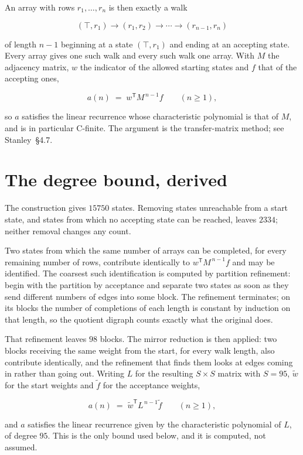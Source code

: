 \documentclass[11pt]{article}
\theoremstyle{definition}
\begin{document}
An array with rows $r_1,\dots,r_n$ is then exactly a walk

\[(\top,r_1) \to (r_1,r_2) \to \cdots \to (r_{n-1},r_n)\]

of length $n-1$ beginning at a state $(\top,r_1)$ and ending at an accepting state. Every array gives one such walk and every such walk one array. With $M$ the adjacency matrix, $w$ the indicator of the allowed starting states and $f$ that of the accepting ones,

\[a(n) \;=\; w^{\mathsf T} M^{\,n-1} f \qquad (n \ge 1),\]

so $a$ satisfies the linear recurrence whose characteristic polynomial is that of $M$, and is in particular C-finite. The argument is the transfer-matrix method; see Stanley~\S4.7.

\section{The degree bound, derived}

The construction gives $15750$ states. Removing states unreachable from a start state, and states from which no accepting state can be reached, leaves $2334$; neither removal changes any count.

Two states from which the same number of arrays can be completed, for every remaining number of rows, contribute identically to $w^{\mathsf T}M^{\,n-1}f$ and may be identified. The coarsest such identification is computed by partition refinement: begin with the partition by acceptance and separate two states as soon as they send different numbers of edges into some block. The refinement terminates; on its blocks the number of completions of each length is constant by induction on that length, so the quotient digraph counts exactly what the original does.

That refinement leaves $98$ blocks. The mirror reduction is then applied: two blocks receiving the same weight from the start, for every walk length, also contribute identically, and the refinement that finds them looks at edges coming in rather than going out. Writing $L$ for the resulting $S \times S$ matrix with $S = 95$, $\tilde w$ for the start weights and $\tilde f$ for the acceptance weights,

\[a(n) \;=\; \tilde w^{\mathsf T} L^{\,n-1} \tilde f \qquad (n \ge 1),\]

and $a$ satisfies the linear recurrence given by the characteristic polynomial of $L$, of degree $95$. This is the only bound used below, and it is computed, not assumed.
\end{document}
